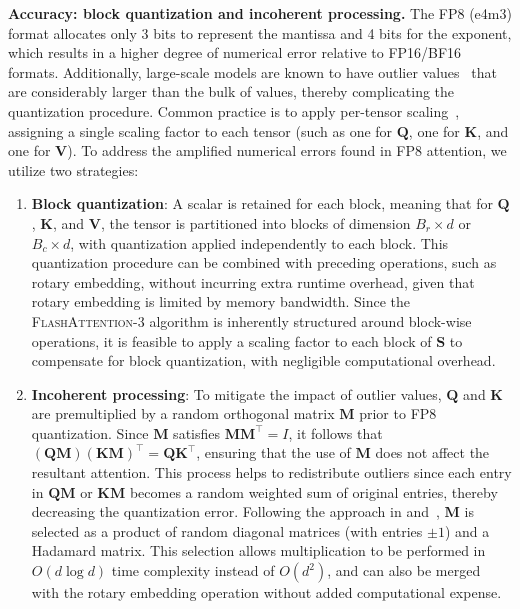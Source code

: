 \begin{enumerate}
\textbf{Accuracy: block quantization and incoherent processing.} The FP8 (e4m3) format allocates only 3 bits to represent the mantissa and 4 bits for the exponent, which results in a higher degree of numerical error relative to FP16/BF16 formats. Additionally, large-scale models are known to have outlier values~\citep{dettmers2208llm, sun2024massive} that are considerably larger than the bulk of values, thereby complicating the quantization procedure. Common practice is to apply per-tensor scaling~\citep{micikevicius2022fp8}, assigning a single scaling factor to each tensor (such as one for $\mathbf{Q}$, one for $\mathbf{K}$, and one for $\mathbf{V}$). To address the amplified numerical errors found in FP8 attention, we utilize two strategies:

\begin{enumerate}

\item \textbf{Block quantization}: A scalar is retained for each block, meaning that for $\mathbf{Q}$, $\mathbf{K}$, and $\mathbf{V}$, the tensor is partitioned into blocks of dimension $B_r \times d$ or $B_c \times d$, with quantization applied independently to each block. This quantization procedure can be combined with preceding operations, such as rotary embedding, without incurring extra runtime overhead, given that rotary embedding is limited by memory bandwidth. Since the \textsc{FlashAttention-3} algorithm is inherently structured around block-wise operations, it is feasible to apply a scaling factor to each block of $\mathbf{S}$ to compensate for block quantization, with negligible computational overhead.

\item \textbf{Incoherent processing}: To mitigate the impact of outlier values, $\mathbf{Q}$ and $\mathbf{K}$ are premultiplied by a random orthogonal matrix $\mathbf{M}$ prior to FP8 quantization. Since $\mathbf{M}$ satisfies $\mathbf{M} \mathbf{M}^\top = I$, it follows that $(\mathbf{Q} \mathbf{M}) (\mathbf{K} \mathbf{M})^\top = \mathbf{Q} \mathbf{K}^\top$, ensuring that the use of $\mathbf{M}$ does not affect the resultant attention. This process helps to redistribute outliers since each entry in $\mathbf{Q} \mathbf{M}$ or $\mathbf{K} \mathbf{M}$ becomes a random weighted sum of original entries, thereby decreasing the quantization error. Following the approach in \citet{chee2024quip} and~\citet{tseng2024quip}, $\mathbf{M}$ is selected as a product of random diagonal matrices (with entries $\pm1$) and a Hadamard matrix. This selection allows multiplication to be performed in $O(d \log d)$ time complexity instead of $O(d^2)$, and can also be merged with the rotary embedding operation without added computational expense.


\end{enumerate}
\end{enumerate}

